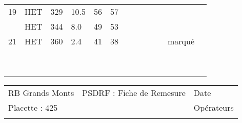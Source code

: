 \documentclass[a4paper, landscape]{article}\usepackage[]{graphicx}\usepackage[]{color}
\begin{document}
{\begin{tabular}{|p{1cm}|p{2cm}|p{1.6cm}|p{1.6cm}|p{1.6cm}|p{1.6cm}|p{1.5cm}|p{1.5cm}|p{1.5cm}|p{1.5cm}|p{1.5cm}|p{7.5cm}|p{5cm}|}
   \hline
19 & HET & 329 & 10.5 & 56 & 57 &  &  &  &  &  &  &  \\ 
   \rowcolor[gray]{0.95} \hline
20 & HET & 344 & 8.0 & 49 & 53 &  &  &  &  &  &  &  \\ 
   \hline
21 & HET & 360 & 2.4 & 41 & 38 &  &  &  &  &  & marqué &  \\ 
   \rowcolor[gray]{0.95} \hline
 &  &  &  &  &  &  &  &  &  &  &  &  \\ 
   \hline
 &  &  &  &  &  &  &  &  &  &  &  &  \\ 
   \rowcolor[gray]{0.95} \hline
 &  &  &  &  &  &  &  &  &  &  &  &  \\ 
   \hline
 &  &  &  &  &  &  &  &  &  &  &  &  \\ 
   \rowcolor[gray]{0.95} \hline
 &  &  &  &  &  &  &  &  &  &  &  &  \\ 
   \hline
 &  &  &  &  &  &  &  &  &  &  &  &  \\ 
   \rowcolor[gray]{0.95} \hline
 &  &  &  &  &  &  &  &  &  &  &  &  \\ 
   \hline
 &  &  &  &  &  &  &  &  &  &  &  &  \\ 
   \rowcolor[gray]{0.95} \hline
 &  &  &  &  &  &  &  &  &  &  &  &  \\ 
   \hline
\end{tabular}
}

\begin{tabular}{p{10cm}p{10cm}p{8cm}}
  RB Grands Monts & PSDRF : Fiche de Remesure & Date \\ 
  Placette : 425 &  & Opérateurs \\ 
   &  &  \\ 
  \end{tabular}
\end{document}
